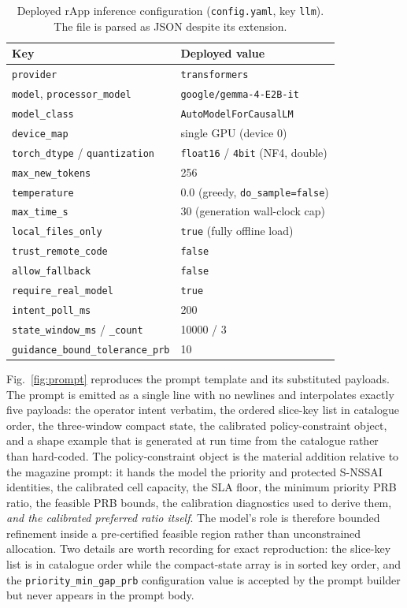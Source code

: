 \begin{table}[t]
\centering
\caption{Deployed rApp inference configuration (\texttt{config.yaml}, key \texttt{llm}). The file is parsed as JSON despite its extension.}
\label{tab:llm-params}
\footnotesize
\begin{tabular}{ll}
\toprule
Key & Deployed value\\
\midrule
\texttt{provider} & \texttt{transformers}\\
\texttt{model}, \texttt{processor\_model} & \texttt{google/gemma-4-E2B-it}\\
\texttt{model\_class} & \texttt{AutoModelForCausalLM}\\
\texttt{device\_map} & single GPU (device 0)\\
\texttt{torch\_dtype} / \texttt{quantization} & \texttt{float16} / \texttt{4bit} (NF4, double)\\
\texttt{max\_new\_tokens} & 256\\
\texttt{temperature} & $0.0$ (greedy, \texttt{do\_sample=false})\\
\texttt{max\_time\_s} & 30 (generation wall-clock cap)\\
\texttt{local\_files\_only} & \texttt{true} (fully offline load)\\
\texttt{trust\_remote\_code} & \texttt{false}\\
\texttt{allow\_fallback} & \texttt{false}\\
\texttt{require\_real\_model} & \texttt{true}\\
\texttt{intent\_poll\_ms} & 200\\
\texttt{state\_window\_ms} / \texttt{\_count} & 10000 / 3\\
\texttt{guidance\_bound\_tolerance\_prb} & 10\\
\bottomrule
\end{tabular}
\end{table}

Fig.~\ref{fig:prompt} reproduces the prompt template and its substituted payloads. The prompt is emitted as a single line with no newlines and interpolates exactly five payloads: the operator intent verbatim, the ordered slice-key list in catalogue order, the three-window compact state, the calibrated policy-constraint object, and a shape example that is generated at run time from the catalogue rather than hard-coded. The policy-constraint object is the material addition relative to the magazine prompt: it hands the model the priority and protected S-NSSAI identities, the calibrated cell capacity, the SLA floor, the minimum priority PRB ratio, the feasible PRB bounds, the calibration diagnostics used to derive them, \emph{and the calibrated preferred ratio itself}. The model's role is therefore bounded refinement inside a pre-certified feasible region rather than unconstrained allocation. Two details are worth recording for exact reproduction: the slice-key list is in catalogue order while the compact-state array is in sorted key order, and the \texttt{priority\_min\_gap\_prb} configuration value is accepted by the prompt builder but never appears in the prompt body.

